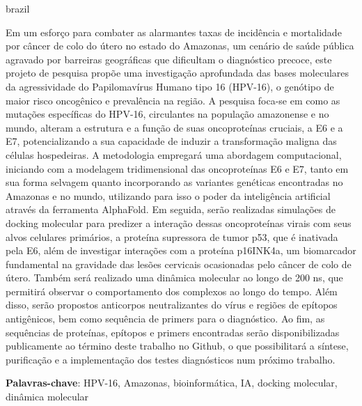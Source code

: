 \setlength{\absparsep}{18pt} %
\begin{resumo}[Resumo]
 \begin{otherlanguage*}{brazil}

   Em um esforço para combater as alarmantes taxas de incidência e mortalidade por câncer de colo do útero no estado do Amazonas, um cenário de saúde pública agravado por barreiras geográficas que dificultam o diagnóstico precoce, este projeto de pesquisa propõe uma investigação aprofundada das bases moleculares da agressividade do Papilomavírus Humano tipo 16 (HPV-16), o genótipo de maior risco oncogênico e prevalência na região. A pesquisa foca-se em como as mutações específicas do HPV-16, circulantes na população amazonense e no mundo, alteram a estrutura e a função de suas oncoproteínas cruciais, a E6 e a E7, potencializando a sua capacidade de induzir a transformação maligna das células hospedeiras. A metodologia empregará uma abordagem computacional, iniciando com a modelagem tridimensional das oncoproteínas E6 e E7, tanto em sua forma selvagem quanto incorporando as variantes genéticas encontradas no Amazonas e no mundo, utilizando para isso o poder da inteligência artificial através da ferramenta AlphaFold. Em seguida, serão realizadas simulações de docking molecular para predizer a interação dessas oncoproteínas virais com seus alvos celulares primários, a proteína supressora de tumor p53, que é inativada pela E6, além de investigar interações com a proteína p16INK4a, um biomarcador fundamental na gravidade das lesões cervicais ocasionadas pelo câncer de colo de útero. Também será realizado uma dinâmica molecular ao longo de 200 ns, que permitirá observar o comportamento dos complexos ao longo do tempo. Além disso, serão  propostos anticorpos neutralizantes do vírus e regiões de epítopos antigênicos, bem como sequência de primers para o diagnóstico. Ao fim,  as sequências de proteínas, epítopos e primers encontradas serão disponibilizadas publicamente ao término deste trabalho no Github, o que possibilitará a síntese, purificação e a implementação dos testes diagnósticos num próximo trabalho.

    \textbf{Palavras-chave}: HPV-16, Amazonas, bioinformática, IA, docking molecular, dinâmica molecular

 \end{otherlanguage*}
\end{resumo}
